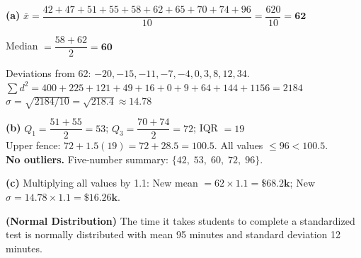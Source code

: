 \documentclass[addpoints]{exam}
\begin{document}
\begin{questions}
\begin{solution}[10cm]
\textbf{(a)} $\bar{x} = \dfrac{42+47+51+55+58+62+65+70+74+96}{10} = \dfrac{620}{10} = \mathbf{62}$

Median $= \dfrac{58+62}{2} = \mathbf{60}$

Deviations from 62: $-20,-15,-11,-7,-4,0,3,8,12,34$.
$\sum d^2 = 400+225+121+49+16+0+9+64+144+1156 = 2184$
$\sigma = \sqrt{2184/10} = \sqrt{218.4} \approx \mathbf{14.78}$

\textbf{(b)} $Q_1 = \dfrac{51+55}{2} = 53$;\; $Q_3 = \dfrac{70+74}{2} = 72$;\; IQR $= 19$\\
Upper fence: $72 + 1.5(19) = 72 + 28.5 = 100.5$. All values $\leq 96 < 100.5$.\\
\textbf{No outliers.} Five-number summary: $\{42,\; 53,\; 60,\; 72,\; 96\}$.

\textbf{(c)} Multiplying all values by 1.1:
New mean $= 62 \times 1.1 = \mathbf{\$68.2\text{k}}$;\quad
New $\sigma = 14.78 \times 1.1 = \mathbf{\$16.26\text{k}}$.
\end{solution}

\question \textbf{(Normal Distribution)} The time it takes students to complete a
standardized test is normally distributed with mean 95 minutes and standard deviation
12 minutes.
\end{questions}
\end{document}
